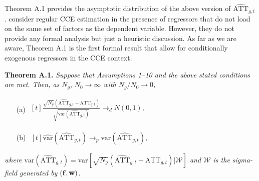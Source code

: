 \documentclass[12pt,fleqn]{article}
\begin{document}
Theorem A.1 provides the asymptotic distribution of the above version of $\widehat{\mathrm{ATT}}_{g,t}$. \citet{de2019cce} consider regular CCE estimation in the presence of regressors that do not load on the same set of factors as the dependent variable. However, they do not provide any formal analysis but just a heuristic discussion. As far as we are aware, Theorem A.1 is the first formal result that allow for conditionally exogenous regressors in the CCE context.


\bigskip

\noindent \textbf{Theorem A.1.} \emph{Suppose that Assumptions 1--10 and the above stated conditions are met. Then, as $N_g,\,N_0\to \infty$ with $N_g/N_0\to 0$,}
\begin{itemize}
  \item[(a) ] $\begin{aligned}[t]
    \frac{\sqrt{N_g}(\widehat{\mathrm{ATT}}_{g,t} - \mathrm{ATT}_{g,t})}{\sqrt{\mathrm{var}(\widehat{\mathrm{ATT}}_{g,t})}} \to_d N(0, 1 ),
    \end{aligned}$

  \item[(b) ] $\begin{aligned}[t]
    \widehat{\mathrm{var}}(\widehat{\mathrm{ATT}}_{g,t}) \to_p \mathrm{var}(\widehat{\mathrm{ATT}}_{g,t}),
    \end{aligned}$
\end{itemize}
\emph{where $\mathrm{var}(\widehat{\mathrm{ATT}}_{g,t}) = \mathrm{var}[\sqrt{N_g}(\widehat{\mathrm{ATT}}_{g,t} - \mathrm{ATT}_{g,t})  |\mathcal{W}]$ and $\mathcal{W}$ is the sigma-field generated by $(\mathbf{f},\overline{\mathbf{w}})$.}

\bigskip
\end{document}

